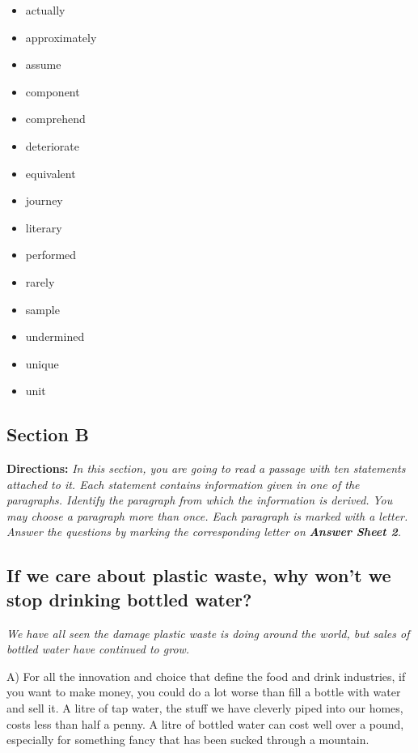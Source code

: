 \documentclass[UTF8,11pt]{ctexart}
\begin{document}
\begin{itemize}[leftmargin=2em,itemsep=.2em,topsep=.4em]\item[A.] actually
\item[B.] approximately
\item[C.] assume
\item[D.] component
\item[E.] comprehend
\item[F.] deteriorate
\item[G.] equivalent
\item[H.] journey
\item[I.] literary
\item[J.] performed
\item[K.] rarely
\item[L.] sample
\item[M.] undermined
\item[N.] unique
\item[O.] unit
\end{itemize}

\subsection*{\textbf{Section B}}


\textbf{Directions:} \textit{In this section, you are going to read a passage with ten statements attached to it. Each statement} \textit{contains information given in one of the paragraphs. Identify the paragraph from which the information is derived.} \textit{You may choose a paragraph more than once. Each paragraph is marked with a letter. Answer the questions by} \textit{marking the corresponding letter on }\textbf{\textit{Answer Sheet 2}}\textit{.}


\subsection*{\textbf{If we care about plastic waste, why won’t we stop drinking bottled water?}}


\textit{We have all seen the damage plastic waste is doing around the world, but sales of bottled water have} \textit{continued to grow.}


A) For all the innovation and choice that define the food and drink industries, if you want to make money, you could do a lot worse than fill a bottle with water and sell it. A litre of tap water, the stuff we have cleverly piped into our homes, costs less than half a penny. A litre of bottled water can cost well over a pound, especially for something fancy that has been sucked through a mountain.
\end{document}
